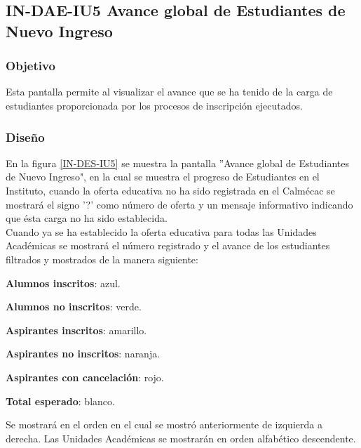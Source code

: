\subsection{IN-DAE-IU5 Avance global de Estudiantes de Nuevo Ingreso}

\subsubsection{Objetivo}

Esta pantalla permite al  visualizar el avance que se ha tenido de la carga de estudiantes proporcionada por los procesos de inscripción ejecutados.

\subsubsection{Diseño}

En la figura \ref{IN-DES-IU5} se muestra la pantalla ''Avance global de Estudiantes de Nuevo Ingreso", en la cual se muestra el progreso de Estudiantes en el Instituto, cuando la oferta educativa no ha sido registrada en el Calmécac se mostrará el signo '?' como número de oferta y un mensaje informativo indicando que ésta carga no ha sido establecida. \\

Cuando ya se ha establecido la oferta educativa para todas las Unidades Académicas se mostrará el número registrado y el avance de los estudiantes filtrados y mostrados de la manera siguiente:\\ \cdtEmpty

\begin{Titemize}
	
	\Titem \textbf{Alumnos inscritos}: azul.
	
	\Titem \textbf{Alumnos no inscritos}: verde.
	
	\Titem \textbf{Aspirantes inscritos}: amarillo.

	\Titem \textbf{Aspirantes no inscritos}: naranja.

	\Titem \textbf{Aspirantes con cancelación}: rojo.
	
	\Titem \textbf{Total esperado}: blanco.

\end{Titemize}

Se mostrará en el orden en el cual se mostró anteriormente de izquierda a derecha. Las Unidades Académicas se mostrarán en orden alfabético descendente.


